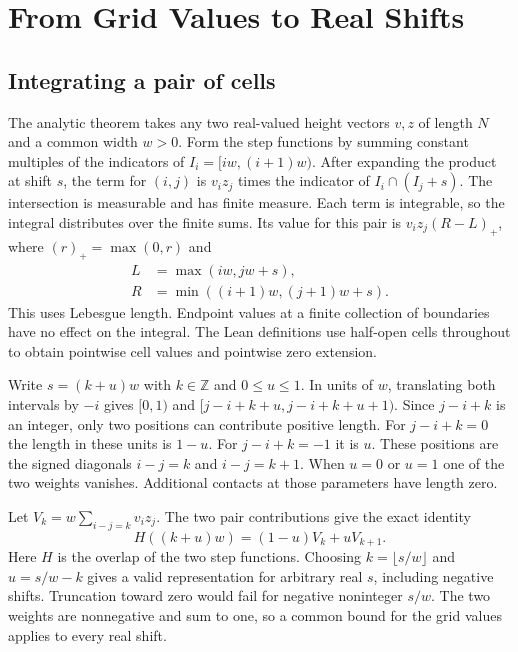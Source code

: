 \documentclass[sigplan,10pt,anonymous,review,balance=false]{acmart}
\begin{document}
\section{From Grid Values to Real Shifts}
\label{sec:affine}

\subsection{Integrating a pair of cells}

The analytic theorem takes any two real-valued height vectors
$v,z$ of length $N$ and a common width $w>0$. Form the step
functions by summing constant multiples of the indicators of
$I_i=[iw,(i+1)w)$. After expanding the product at shift $s$,
the term for $(i,j)$ is $v_i z_j$ times the indicator of
$I_i\cap(I_j+s)$. The intersection is measurable and has finite
measure. Each term is integrable, so the integral distributes
over the finite sums. Its value for this pair is
$v_i z_j(R-L)_+$, where $(r)_+=\max(0,r)$ and
\[
 \begin{aligned}
 L&=\max(iw,jw+s),\\
 R&=\min((i+1)w,(j+1)w+s).
 \end{aligned}
\] This uses Lebesgue length. Endpoint
values at a finite collection of boundaries have no effect on the
integral. The Lean definitions use half-open cells throughout to
obtain pointwise cell values and pointwise zero extension.

Write $s=(k+u)w$ with $k\in\mathbb Z$ and $0\le u\le1$.
In units of $w$, translating both intervals by $-i$ gives
$[0,1)$ and $[j-i+k+u,j-i+k+u+1)$. Since $j-i+k$ is an
integer, only two positions can contribute positive length.
For $j-i+k=0$ the length in these units is $1-u$.
For $j-i+k=-1$ it is $u$. These positions are the signed
diagonals $i-j=k$ and $i-j=k+1$. When $u=0$ or $u=1$ one
of the two weights vanishes. Additional contacts at those
parameters have length zero.

Let $V_k=w\sum_{i-j=k}v_i z_j$. The two pair contributions
give the exact identity
\begin{equation}
 H((k+u)w)=(1-u)V_k+uV_{k+1}.
 \label{eq:affine}
\end{equation}
Here $H$ is the overlap of the two step functions. Choosing
$k=\lfloor s/w\rfloor$ and $u=s/w-k$ gives a valid
representation for arbitrary real $s$, including negative shifts.
Truncation toward zero would fail for negative noninteger $s/w$.
The two weights are nonnegative and sum to one, so a common bound
for the grid values applies to every real shift.
\end{document}
